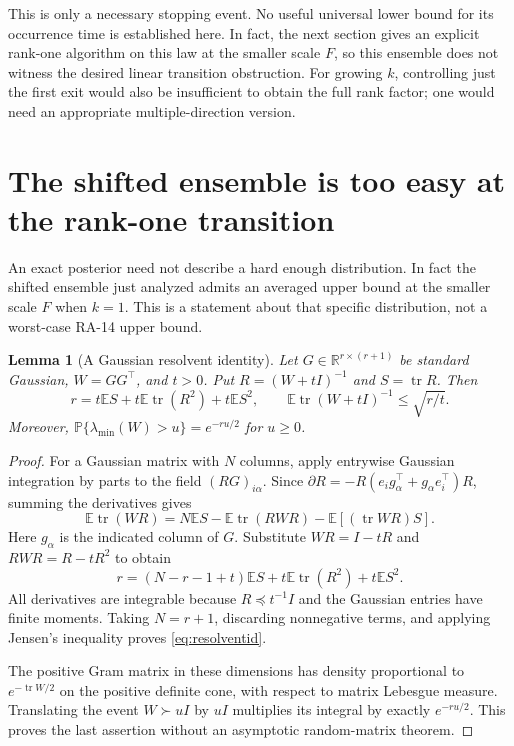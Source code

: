 \documentclass[11pt]{article}
\newtheorem{lemma}[theorem]{Lemma}
\theoremstyle{definition}
\newcommand{\R}{\mathbb R}
\newcommand{\E}{\mathbb E}
\newcommand{\Prob}{\mathbb P}
\newcommand{\tr}{\operatorname{tr}}
\begin{document}
This is only a necessary stopping event. No useful universal lower bound for its occurrence time is established here. In fact, the next section gives an explicit rank-one algorithm on this law at the smaller scale $F$, so this ensemble does not witness the desired linear transition obstruction. For growing $k$, controlling just the first exit would also be insufficient to obtain the full rank factor; one would need an appropriate multiple-direction version.

\section{The shifted ensemble is too easy at the rank-one transition}\label{sec:ensembleupper}
An exact posterior need not describe a hard enough distribution. In fact the shifted ensemble just analyzed admits an averaged upper bound at the smaller scale $F$ when $k=1$. This is a statement about that specific distribution, not a worst-case RA-14 upper bound.

\begin{lemma}[A Gaussian resolvent identity]\label{lem:resolvent}
Let $G\in\R^{r\times(r+1)}$ be standard Gaussian, $W=GG^\top$, and $t>0$. Put $R=(W+tI)^{-1}$ and $S=\tr R$. Then
\begin{equation}\label{eq:resolventid}
r=t\E S+t\E\tr(R^2)+t\E S^2,
\qquad \E\tr(W+tI)^{-1}\le\sqrt{r/t}.
\end{equation}
Moreover, $\Prob\{\lambda_{\min}(W)>u\}=e^{-ru/2}$ for $u\ge0$.
\end{lemma}
\begin{proof}
For a Gaussian matrix with $N$ columns, apply entrywise Gaussian integration by parts to the field $(RG)_{i\alpha}$. Since
$\partial R=-R(e_i g_\alpha^\top+g_\alpha e_i^\top)R$, summing the derivatives gives
\[
\E\tr(WR)=N\E S-\E\tr(RWR)-\E[(\tr WR)S].
\]
Here $g_\alpha$ is the indicated column of $G$. Substitute $WR=I-tR$ and $RWR=R-tR^2$ to obtain
\[
r=(N-r-1+t)\E S+t\E\tr(R^2)+t\E S^2.
\]
All derivatives are integrable because $R\preceq t^{-1}I$ and the Gaussian entries have finite moments. Taking $N=r+1$, discarding nonnegative terms, and applying Jensen's inequality proves \eqref{eq:resolventid}.

The positive Gram matrix in these dimensions has density proportional to $e^{-\tr W/2}$ on the positive definite cone, with respect to matrix Lebesgue measure. Translating the event $W\succ uI$ by $uI$ multiplies its integral by exactly $e^{-ru/2}$. This proves the last assertion without an asymptotic random-matrix theorem.
\end{proof}
\end{document}
